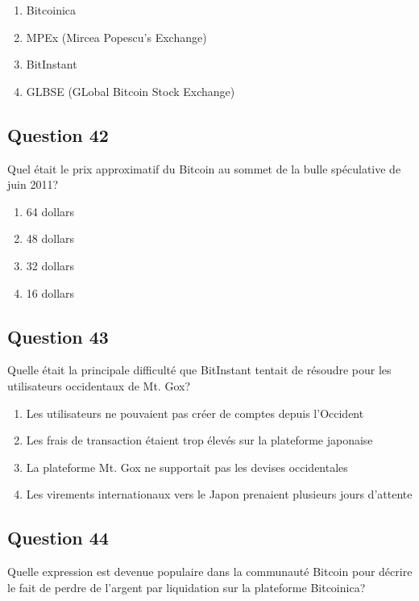 \documentclass[12pt,a4paper]{article}
\begin{document}
\begin{enumerate}[label=\Alph*., leftmargin=*]
\item Bitcoinica
\item MPEx (Mircea Popescu's Exchange)
\item BitInstant
\item GLBSE (GLobal Bitcoin Stock Exchange)
\end{enumerate}

\bigskip


\subsection*{Question 42}
Quel était le prix approximatif du Bitcoin au sommet de la bulle spéculative de juin 2011?

\begin{enumerate}[label=\Alph*., leftmargin=*]
\item 64 dollars
\item 48 dollars
\item 32 dollars
\item 16 dollars
\end{enumerate}

\bigskip


\subsection*{Question 43}
Quelle était la principale difficulté que BitInstant tentait de résoudre pour les utilisateurs occidentaux de Mt. Gox?

\begin{enumerate}[label=\Alph*., leftmargin=*]
\item Les utilisateurs ne pouvaient pas créer de comptes depuis l'Occident
\item Les frais de transaction étaient trop élevés sur la plateforme japonaise
\item La plateforme Mt. Gox ne supportait pas les devises occidentales
\item Les virements internationaux vers le Japon prenaient plusieurs jours d'attente
\end{enumerate}

\bigskip


\subsection*{Question 44}
Quelle expression est devenue populaire dans la communauté Bitcoin pour décrire le fait de perdre de l'argent par liquidation sur la plateforme Bitcoinica?
\end{document}

